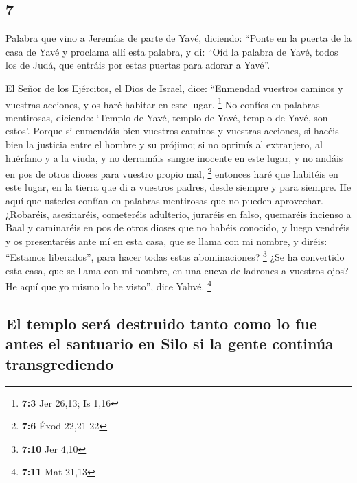 \begin{paracol}{2}
\hypertarget{section-12}{%
\section{7}\label{section-12}}

 Palabra que vino a Jeremías de parte de Yavé, diciendo:
 ``Ponte en la puerta de la casa de Yavé y proclama allí
esta palabra, y di: ``Oíd la palabra de Yavé, todos los de Judá, que
entráis por estas puertas para adorar a Yavé''.

 El Señor de los Ejércitos, el Dios de Israel, dice:
``Enmendad vuestros caminos y vuestras acciones, y os haré habitar en
este lugar. \footnote{\textbf{7:3} Jer 26,13; Is 1,16}  No
confíes en palabras mentirosas, diciendo: `Templo de Yavé, templo de
Yavé, templo de Yavé, son estos'.  Porque si enmendáis
bien vuestros caminos y vuestras acciones, si hacéis bien la justicia
entre el hombre y su prójimo;  si no oprimís al
extranjero, al huérfano y a la viuda, y no derramáis sangre inocente en
este lugar, y no andáis en pos de otros dioses para vuestro propio mal,
\footnote{\textbf{7:6} Éxod 22,21-22}  entonces haré que
habitéis en este lugar, en la tierra que di a vuestros padres, desde
siempre y para siempre.  He aquí que ustedes confían en
palabras mentirosas que no pueden aprovechar.  ¿Robaréis,
asesinaréis, cometeréis adulterio, juraréis en falso, quemaréis incienso
a Baal y caminaréis en pos de otros dioses que no habéis conocido,
 y luego vendréis y os presentaréis ante mí en esta casa,
que se llama con mi nombre, y diréis: ``Estamos liberados'', para hacer
todas estas abominaciones? \footnote{\textbf{7:10} Jer 4,10}
 ¿Se ha convertido esta casa, que se llama con mi nombre,
en una cueva de ladrones a vuestros ojos? He aquí que yo mismo lo he
visto'', dice Yahvé. \footnote{\textbf{7:11} Mat 21,13}

\hypertarget{el-templo-seruxe1-destruido-tanto-como-lo-fue-antes-el-santuario-en-silo-si-la-gente-continuxfaa-transgrediendo}{%
\subsection{El templo será destruido tanto como lo fue antes el
santuario en Silo si la gente continúa
transgrediendo}\label{el-templo-seruxe1-destruido-tanto-como-lo-fue-antes-el-santuario-en-silo-si-la-gente-continuxfaa-transgrediendo}}


\end{paracol}
